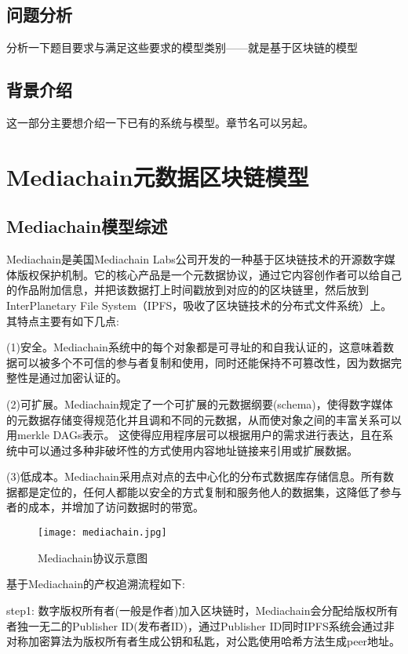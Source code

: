 \documentclass[withoutpreface,bwprint]{cumcmthesis} %
\begin{document}
\subsection{问题分析}
分析一下题目要求与满足这些要求的模型类别——就是基于区块链的模型
\subsection{背景介绍}
这一部分主要想介绍一下已有的系统与模型。章节名可以另起。

\section{Mediachain元数据区块链模型}

\subsection{Mediachain模型综述}
Mediachain是美国Mediachain Labs公司开发的一种基于区块链技术的开源数字媒体版权保护机制。它的核心产品是一个元数据协议，通过它内容创作者可以给自己的作品附加信息，并把该数据打上时间戳放到对应的的区块链里，然后放到InterPlanetary File System（IPFS，吸收了区块链技术的分布式文件系统）上。其特点主要有如下几点:

(1)安全。Mediachain系统中的每个对象都是可寻址的和自我认证的，这意味着数据可以被多个不可信的参与者复制和使用，同时还能保持不可篡改性，因为数据完整性是通过加密认证的。

(2)可扩展。Mediachain规定了一个可扩展的元数据纲要(schema)，使得数字媒体的元数据存储变得规范化并且调和不同的元数据，从而使对象之间的丰富关系可以用merkle DAGs表示。
这使得应用程序层可以根据用户的需求进行表达，且在系统中可以通过多种非破坏性的方式使用内容地址链接来引用或扩展数据。

(3)低成本。Mediachain采用点对点的去中心化的分布式数据库存储信息。所有数据都是定位的，任何人都能以安全的方式复制和服务他人的数据集，这降低了参与者的成本，并增加了访问数据时的带宽。

\begin{figure}[!h]
	\centering
	\texttt{[image: mediachain.jpg]}
	\caption{Mediachain协议示意图}
\end{figure}

基于Mediachain的产权追溯流程如下:

step1: 数字版权所有者(一般是作者)加入区块链时，Mediachain会分配给版权所有者独一无二的Publisher ID(发布者ID)，通过Publisher ID同时IPFS系统会通过非对称加密算法为版权所有者生成公钥和私匙，对公匙使用哈希方法生成peer地址。
\end{document}
